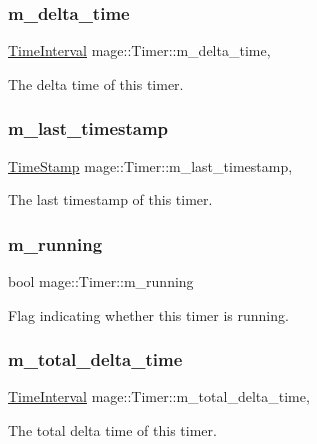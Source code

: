 \subsubsection{\texorpdfstring{m\+\_\+delta\+\_\+time}{m\_delta\_time}}
{\footnotesize\ttfamily \hyperlink{classmage_1_1_timer_a5e38d0ad64043ad3622072e7b6637d98}{Time\+Interval} mage\+::\+Timer\+::m\+\_\+delta\+\_\+time\hspace{0.3cm}{\ttfamily [mutable]}, {\ttfamily [private]}}

The delta time of this timer. \hypertarget{classmage_1_1_timer_af87b641f17eba20552a7a309dfc3761a}{}\label{classmage_1_1_timer_af87b641f17eba20552a7a309dfc3761a} 
\subsubsection{\texorpdfstring{m\+\_\+last\+\_\+timestamp}{m\_last\_timestamp}}
{\footnotesize\ttfamily \hyperlink{classmage_1_1_timer_aff202783fe113efdf539f9dc685a158c}{Time\+Stamp} mage\+::\+Timer\+::m\+\_\+last\+\_\+timestamp\hspace{0.3cm}{\ttfamily [mutable]}, {\ttfamily [private]}}

The last timestamp of this timer. \hypertarget{classmage_1_1_timer_ac8d975843e5b2199848284de910d3291}{}\label{classmage_1_1_timer_ac8d975843e5b2199848284de910d3291} 
\subsubsection{\texorpdfstring{m\+\_\+running}{m\_running}}
{\footnotesize\ttfamily bool mage\+::\+Timer\+::m\+\_\+running\hspace{0.3cm}{\ttfamily [private]}}

Flag indicating whether this timer is running. \hypertarget{classmage_1_1_timer_a642e43f01ce61c54c89ea116235342e9}{}\label{classmage_1_1_timer_a642e43f01ce61c54c89ea116235342e9} 
\subsubsection{\texorpdfstring{m\+\_\+total\+\_\+delta\+\_\+time}{m\_total\_delta\_time}}
{\footnotesize\ttfamily \hyperlink{classmage_1_1_timer_a5e38d0ad64043ad3622072e7b6637d98}{Time\+Interval} mage\+::\+Timer\+::m\+\_\+total\+\_\+delta\+\_\+time\hspace{0.3cm}{\ttfamily [mutable]}, {\ttfamily [private]}}

The total delta time of this timer. 